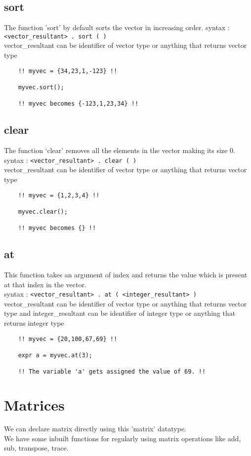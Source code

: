 \documentclass[journal, 18pt]{report}
\begin{document}
\subsection{sort}
The function 'sort' by default sorts the vector in increasing order.
syntax : \texttt{<vector\_resultant> . sort ( )} \\
vector\_resultant can be identifier of vector type or anything that returns vector type
\begin{lstlisting}
    !! myvec = {34,23,1,-123} !!

    myvec.sort();

    !! myvec becomes {-123,1,23,34} !!
\end{lstlisting}
\subsection{clear}
The function `clear' removes all the elements in the vector making its size 0.
syntax : \texttt{<vector\_resultant> . clear ( )} \\
vector\_resultant can be identifier of vector type or anything that returns vector type
\begin{lstlisting}
    !! myvec = {1,2,3,4} !!

    myvec.clear();

    !! myvec becomes {} !!
\end{lstlisting}
\subsection{at}
This function takes an argument of index and returns the value which is present at that index in the vector.\\

syntax : \texttt{<vector\_resultant> . at ( <integer\_resultant> )} \\
vector\_resultant can be identifier of vector type or anything that returns vector type and integer\_resultant can be identifier of integer type or anything that returns integer type
\begin{lstlisting}
    !! myvec = {20,100,67,69} !!

    expr a = myvec.at(3);

    !! The variable 'a' gets assigned the value of 69. !!
\end{lstlisting}
\section{Matrices}
We can declare matrix directly using this 'matrix' datatype.\\
We have some inbuilt functions for regularly using matrix operations like add, sub, transpose, trace.
\end{document}
